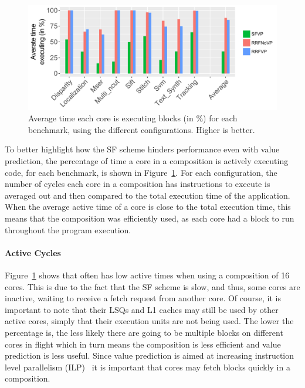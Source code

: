 \begin{figure}[t]
    \centering
    \includegraphics[width=1\textwidth]{chapter3/graphics/perf_av_cycle_exec4.pdf}
    \caption{Average time each core is executing blocks (in \%) for each benchmark, using the different configurations. Higher is better.}
    \label{fig:perf_av_cycle}
	\vspace{1em}
\end{figure}

To better highlight how the SF scheme hinders performance even with value prediction, the percentage of time a core in a composition is actively executing code, for each benchmark, is shown in Figure~\ref{fig:perf_av_cycle}.
For each configuration, the number of cycles each core in a composition has instructions to execute is averaged out and then compared to the total execution time of the application.
When the average active time of a core is close to the total execution time, this means that the composition was efficiently used, as each core had a block to run throughout the program execution.

\paragraph*{Active Cycles}
Figure~\ref{fig:perf_av_cycle} shows that \vp{} often has low active times when using a composition of 16 cores.
This is due to the fact that the SF scheme is slow, and thus, some cores are inactive, waiting to receive a fetch request from another core.
Of course, it is important to note that their LSQs and L1 caches may still be used by other active cores, simply that their execution units are not being used.
The lower the percentage is, the less likely there are going to be multiple blocks on different cores in flight which in turn means the composition is less efficient and value prediction is less useful.
Since value prediction is aimed at increasing instruction level parallelism (ILP)~\cite{peraisBeBop2015} it is important that cores may fetch blocks quickly in a composition.

